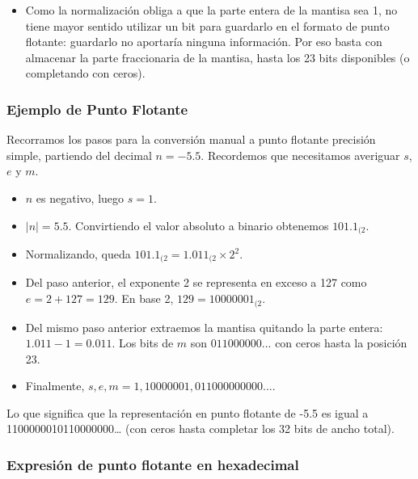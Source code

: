 \documentclass[spanish,A4,]{article}
\begin{document}
\begin{enumerate}
  \begin{itemize}
  \itemsep1pt\parskip0pt
  \item
    Como la normalización obliga a que la parte entera de la mantisa sea
    1, no tiene mayor sentido utilizar un bit para guardarlo en el
    formato de punto flotante: guardarlo no aportaría ninguna
    información. Por eso basta con almacenar la parte fraccionaria de la
    mantisa, hasta los 23 bits disponibles (o completando con ceros).
  \end{itemize}
\end{enumerate}

\subsubsection{Ejemplo de Punto
Flotante}\label{ejemplo-de-punto-flotante}

Recorramos los pasos para la conversión manual a punto flotante
precisión simple, partiendo del decimal $n = -5.5$. Recordemos que
necesitamos averiguar $s$, $e$ y $m$.

\begin{itemize}
\itemsep1pt\parskip0pt
\item
  $n$ es negativo, luego $s = 1$.
\item
  $|n| = 5.5$. Convirtiendo el valor absoluto a binario obtenemos
  $101.1_{(2}$.
\item
  Normalizando, queda $101.1_{(2} = 1.011_{(2}\times 2^2$.
\item
  Del paso anterior, el exponente 2 se representa en exceso a 127 como
  $e = 2 + 127 = 129$. En base 2, $129 = 10000001_{(2}$.
\item
  Del mismo paso anterior extraemos la mantisa quitando la parte entera:
  $1.011 - 1 = 0.011$. Los bits de $m$ son $011000000...$ con ceros
  hasta la posición 23.
\item
  Finalmente, $s, e, m = 1, 10000001, 011000000000...$.
\end{itemize}

Lo que significa que la representación en punto flotante de -5.5 es
igual a 1100000010110000000\ldots{} (con ceros hasta completar los 32
bits de ancho total).

\subsubsection{Expresión de punto flotante en
hexadecimal}\label{expresiuxf3n-de-punto-flotante-en-hexadecimal}
\end{document}

